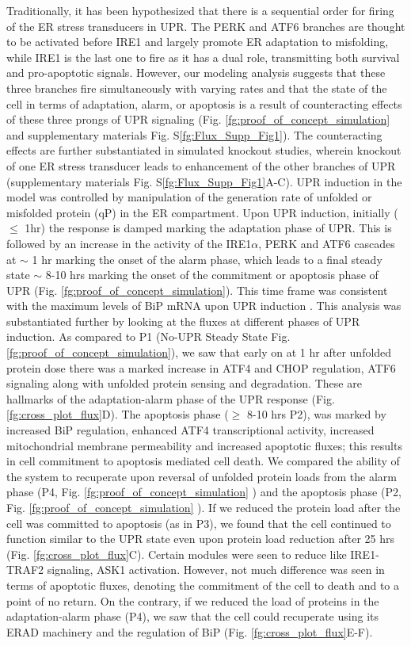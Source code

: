 \documentclass[fleqn,10pt]{wlscirep}
\begin{document}
Traditionally, it has been hypothesized that there is a sequential order for firing of the ER stress transducers in UPR. The PERK and ATF6 branches are thought to be activated before IRE1 \cite{szegezdi2006mediators} and largely promote ER adaptation to misfolding, while IRE1 is the last one to fire as it has a dual role, transmitting both survival and pro-apoptotic signals. However, our modeling analysis suggests that these three branches fire simultaneously with varying rates and that the state of the cell in terms of adaptation, alarm, or apoptosis is a result of counteracting effects of these three prongs of UPR signaling (Fig. \ref{fg:proof_of_concept_simulation} and supplementary materials Fig. S\ref{fg:Flux_Supp_Fig1}). The counteracting effects are further substantiated in simulated knockout studies, wherein knockout of one ER stress transducer leads to enhancement of the other branches of UPR (supplementary materials Fig. S\ref{fg:Flux_Supp_Fig1}A-C). UPR induction in the model was controlled by manipulation of the generation rate of unfolded or misfolded protein (qP) in the ER compartment. Upon UPR induction, initially ($\leq$ 1hr) the response is damped marking the adaptation phase of UPR. This is followed by an increase in the activity of the IRE1$\alpha$, PERK and ATF6 cascades at $\sim$ 1 hr marking the onset of the alarm phase, which leads to a final steady state $\sim$ 8-10 hrs marking the onset of the commitment or apoptosis phase of UPR (Fig. \ref{fg:proof_of_concept_simulation}). This time frame was consistent with the maximum levels of BiP mRNA upon UPR induction \cite{lin2007ire1}. This analysis was substantiated further by looking at the fluxes at different phases of UPR induction. As compared to P1 (No-UPR Steady State Fig. \ref{fg:proof_of_concept_simulation}), we saw that early on at 1 hr after unfolded protein dose there was a marked increase in ATF4 and CHOP regulation, ATF6 signaling along with unfolded protein sensing and degradation. These are hallmarks of the adaptation-alarm phase of the UPR response (Fig. \ref{fg:cross_plot_flux}D). The apoptosis phase ($\geq$ 8-10 hrs P2), was marked by increased BiP regulation, enhanced ATF4 transcriptional activity, increased mitochondrial membrane permeability and increased apoptotic fluxes; this results in cell commitment to apoptosis mediated cell death. We compared the ability of the system to recuperate upon reversal of unfolded protein loads from the alarm phase (P4, Fig. \ref{fg:proof_of_concept_simulation} ) and the apoptosis phase (P2, Fig. \ref{fg:proof_of_concept_simulation} ). If we reduced the protein load after the cell was committed to apoptosis (as in P3), we found that the cell continued to function similar to the UPR state even upon protein load reduction after 25 hrs (Fig. \ref{fg:cross_plot_flux}C). Certain modules were seen to reduce like IRE1-TRAF2 signaling, ASK1 activation. However, not much difference was seen in terms of apoptotic fluxes, denoting the commitment of the cell to death and to a point of no return. On the contrary, if we reduced the load of proteins in the adaptation-alarm phase (P4), we saw that the cell could recuperate using its ERAD machinery and the regulation of BiP (Fig. \ref{fg:cross_plot_flux}E-F). 
\end{document}
